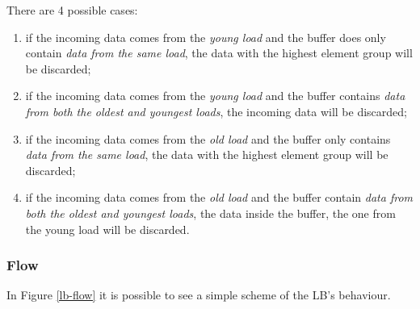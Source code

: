 There are 4 possible cases:
\begin{enumerate}
    \item if the incoming data comes from the \emph{young load} and the buffer does only contain \emph{data from the same load}, the data with the highest element group will be discarded;
    
    \item if the incoming data comes from the \emph{young load} and the buffer contains \emph{data from both the oldest and youngest loads}, the incoming data will be discarded;
    
    \item if the incoming data comes from the \emph{old load} and the buffer only contains \emph{data from the same load}, the data with the highest element group will be discarded;
    
    \item if the incoming data comes from the \emph{old load} and the buffer contain \emph{data from both the oldest and youngest loads}, the data inside the buffer, the one from the young load will be discarded.
\end{enumerate}



\subsubsection{Flow}
In Figure \ref{lb-flow} it is possible to see a simple scheme of the LB's behaviour.

